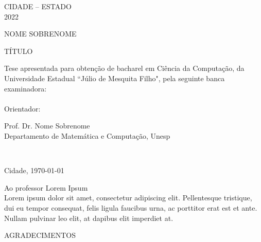 \documentclass[12pt,nodisplayskipstretch]{article}
\newcommand{\titulo}{\uppercase{Título}}
\begin{document}
\begin{center}
\uppercase{Cidade -- Estado\\2022}
\end{center}


\newpage 
\thispagestyle{empty}
\begin{center}
    \uppercase{Nome Sobrenome}
\end{center}
\vspace{2cm}
\begin{center}
    \titulo
\end{center}
\vspace{2cm}
Tese apresentada para obtenção de bacharel em Ciência da Computação, da Universidade Estadual ``Júlio de Mesquita Filho", pela seguinte banca examinadora:
\\
\vspace{3cm}
\\
Orientador:
\hspace{5mm}
\begin{minipage}[t]{11cm}
Prof. Dr. Nome Sobrenome\\
Departamento de Matemática e Computação, Unesp\\
\end{minipage}\\

\vspace*{\fill}

\begin{center}
    Cidade, \today
\end{center}

\newpage
\thispagestyle{empty}
\vspace*{\fill}
\hspace{34mm}
\begin{minipage}{11cm}
Ao professor Lorem Ipsum\\
Lorem ipsum dolor sit amet, consectetur adipiscing elit. Pellentesque tristique, dui eu tempor consequat, felis ligula faucibus urna, ac porttitor erat est et ante. Nullam pulvinar leo elit, at dapibus elit imperdiet at.
\end{minipage}

\newpage
\thispagestyle{empty}
\begin{center}
    \uppercase{Agradecimentos}
\end{center}
\lipsum[1]
\end{document}
